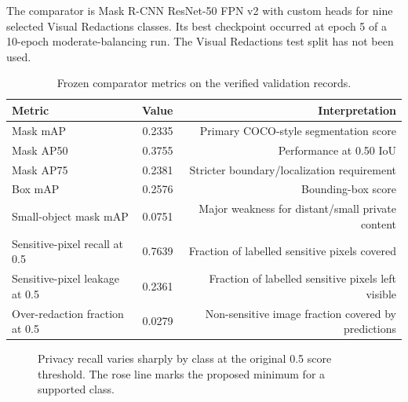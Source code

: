 The comparator is Mask R-CNN ResNet-50 FPN v2 with custom heads for nine selected Visual Redactions classes. Its best checkpoint occurred at epoch 5 of a 10-epoch moderate-balancing run. The Visual Redactions test split has not been used.

\begin{table}[htbp]
\centering
\caption{Frozen comparator metrics on the verified validation records.}
\begin{tabular}{@{}lrr@{}}
\toprule
\textbf{Metric} & \textbf{Value} & \textbf{Interpretation} \\
\midrule
Mask mAP & 0.2335 & Primary COCO-style segmentation score \\
Mask AP50 & 0.3755 & Performance at 0.50 IoU \\
Mask AP75 & 0.2381 & Stricter boundary/localization requirement \\
Box mAP & 0.2576 & Bounding-box score \\
Small-object mask mAP & 0.0751 & Major weakness for distant/small private content \\
Sensitive-pixel recall at 0.5 & 0.7639 & Fraction of labelled sensitive pixels covered \\
Sensitive-pixel leakage at 0.5 & 0.2361 & Fraction of labelled sensitive pixels left visible \\
Over-redaction fraction at 0.5 & 0.0279 & Non-sensitive image fraction covered by predictions \\
\bottomrule
\end{tabular}
\end{table}

\begin{figure}[htbp]
\centering
{}
\caption{Privacy recall varies sharply by class at the original 0.5 score threshold. The rose line marks the proposed minimum for a supported class.}
\end{figure}

